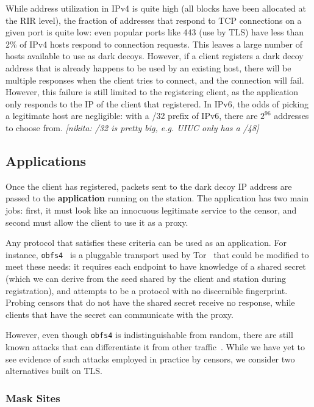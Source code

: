 \documentclass[letterpaper,twocolumn,10pt]{article}
\newcommand{\note}[2]{\textit{[#1: #2]}}
\newcommand{\nikita}[1]{\note{nikita}{#1}}
\begin{document}
While address utilization in IPv4 is quite high (all blocks have been allocated
at the RIR level), the fraction of addresses that respond to TCP connections on
a given port is quite low: even popular ports like 443 (use by TLS) have less
than 2\% of IPv4 hosts respond to connection requests. This leaves a large
number of hosts available to use as dark decoys. However, if a client registers
a dark decoy address that is already happens to be used by an existing host,
there will be multiple responses when the client tries to connect, and the
connection will fail. However, this failure is still limited to the registering
client, as the application only responds to the IP of the client that
registered. In IPv6, the odds of picking a legitimate host are negligible: with
a /32 prefix of IPv6, there are $2^{96}$ addresses to choose from.
\nikita{/32 is pretty big, e.g. UIUC only has a /48}


\subsection{Applications}


Once the client has registered, packets sent to the dark decoy IP address are
passed to the \textbf{application} running on the station. The application has
two main jobs: first, it must look like an innocuous legitimate service to the
censor, and second must allow the client to use it as a proxy.

Any protocol that satisfies these criteria can be used as an application. For
instance, \texttt{obfs4}~\cite{obfs4} is a pluggable transport used by
Tor~\cite{tor} that could be
modified to meet these needs: it requires each endpoint to have knowledge of a
shared secret (which we can derive from the seed shared by the client and
station during registration), and attempts to be a protocol with no discernible
fingerprint. Probing censors that do not have the shared secret receive no
response, while clients that have the secret can communicate with the proxy.

However, even though \texttt{obfs4} is indistinguishable from random, there are
still known attacks that can differentiate it from other
traffic~\cite{wang2015seeing}. While we have yet to see evidence of such attacks
employed in practice by censors, we consider two alternatives built on TLS.


\FigOverview

\subsubsection{Mask Sites}
\end{document}
